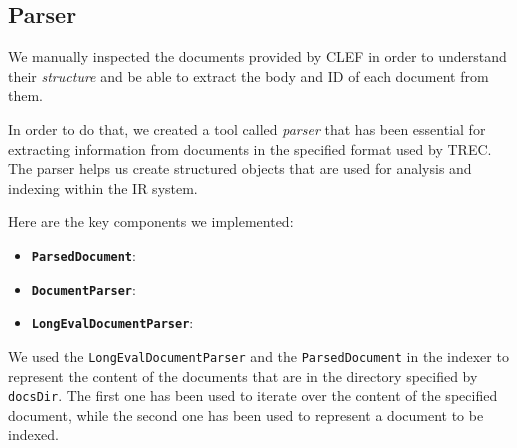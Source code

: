 \subsection{Parser}
\label{subsec:parser}

We manually inspected the documents provided by \ac{CLEF} in order to understand their \emph{structure} and be able to extract the body and ID of each document from them.

In order to do that, we created a tool called \emph{parser} that has been essential for extracting information from documents in the specified format 
used by \ac{TREC}. The parser helps us create structured objects that are used for analysis and indexing within the \ac{IR} system.

Here are the key components we implemented:
\begin{itemize}
    \item  \textbf{\texttt{ParsedDocument}}: 
    \item  \textbf{\texttt{DocumentParser}}: 
    \item  \textbf{\texttt{LongEvalDocumentParser}}: 
\end{itemize}   

We used  the \texttt{LongEvalDocumentParser} and the \texttt{ParsedDocument} in the indexer to represent the content of the documents that are 
in the directory specified by \texttt{docsDir}. The first one has been used to iterate over the content of the specified document, while the second one has been used to represent a document to be indexed.